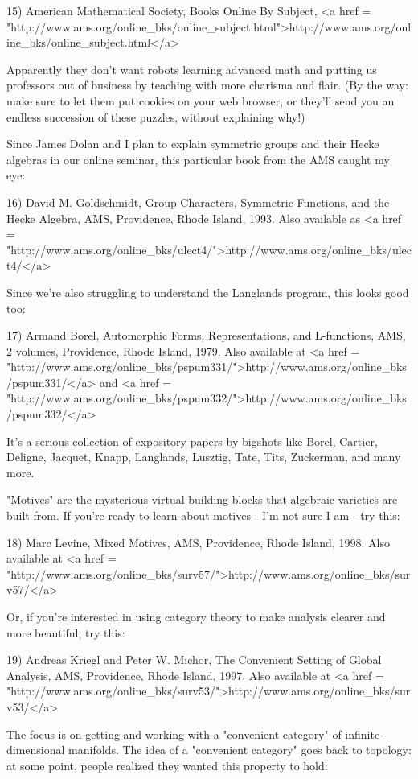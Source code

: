 15) American Mathematical Society, Books Online By Subject,
<a href = "http://www.ams.org/online_bks/online_subject.html">http://www.ams.org/online_bks/online_subject.html</a>

Apparently they don't want robots learning advanced math and putting
us professors out of business by teaching with more charisma and flair.
(By the way: make sure to let them put cookies on your
web browser, or they'll send you an endless succession of these
puzzles, without explaining why!)

Since James Dolan and I plan to explain symmetric groups and their 
Hecke algebras in our online seminar, this particular book from the AMS
caught my eye:

16) David M. Goldschmidt, Group Characters, Symmetric Functions, 
and the Hecke Algebra, AMS, Providence, Rhode Island, 1993.
Also available as <a href = "http://www.ams.org/online_bks/ulect4/">http://www.ams.org/online_bks/ulect4/</a>

Since we're also struggling to understand the Langlands program, 
this looks good too:

17) Armand Borel, Automorphic Forms, Representations, and L-functions,
AMS, 2 volumes, Providence, Rhode Island, 1979.  Also available at
<a href = "http://www.ams.org/online_bks/pspum331/">http://www.ams.org/online_bks/pspum331/</a> and
<a href = "http://www.ams.org/online_bks/pspum332/">http://www.ams.org/online_bks/pspum332/</a>

It's a serious collection of expository papers by bigshots like 
Borel, Cartier, Deligne, Jacquet, Knapp, Langlands, Lusztig, Tate, 
Tits, Zuckerman, and many more.

"Motives" are the mysterious virtual building blocks that algebraic
varieties are built from.  If you're ready to learn about motives -
I'm not sure I am - try this:

18) Marc Levine, Mixed Motives, AMS, Providence, Rhode Island, 1998.
Also available at <a href = "http://www.ams.org/online_bks/surv57/">http://www.ams.org/online_bks/surv57/</a>

Or, if you're interested in using category theory to make analysis
clearer and more beautiful, try this:

19) Andreas Kriegl and Peter W. Michor, The Convenient Setting of
Global Analysis, AMS, Providence, Rhode Island, 1997.  Also available
at <a href =
"http://www.ams.org/online_bks/surv53/">http://www.ams.org/online_bks/surv53/</a>

The focus is on getting and working with a "convenient
category" of infinite-dimensional manifolds.  The idea of a
"convenient category" goes back to topology: at some point,
people realized they wanted this property to hold:


